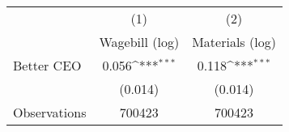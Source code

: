 {
\def\sym#1{\ifmmode^{#1}\else\(^{#1}\)\fi}
\begin{tabular}{l*{2}{c}}
\hline\hline
                    &\multicolumn{1}{c}{(1)}&\multicolumn{1}{c}{(2)}\\
                    &\multicolumn{1}{c}{Wagebill (log)}&\multicolumn{1}{c}{Materials (log)}\\
\hline
Better CEO          &       0.056\sym{***}&       0.118\sym{***}\\
                    &     (0.014)         &     (0.014)         \\
\hline
Observations        &      700423         &      700423         \\
\hline\hline
\end{tabular}
}

